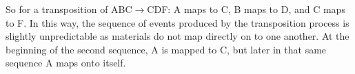 So for a transposition of ABC$\rightarrow$CDF: A maps to C, B maps to D, and C maps to F. In this way, the sequence of events produced by the transposition process is slightly unpredictable as materials do not map directly on to one another. At the beginning of the second sequence, A is mapped to C, but later in that same sequence A maps onto itself.

\begin{table}[H]
    \centering
{}
\caption{Polillas moments part 1}
    \label{fig:p-moments-1}
\end{table}

